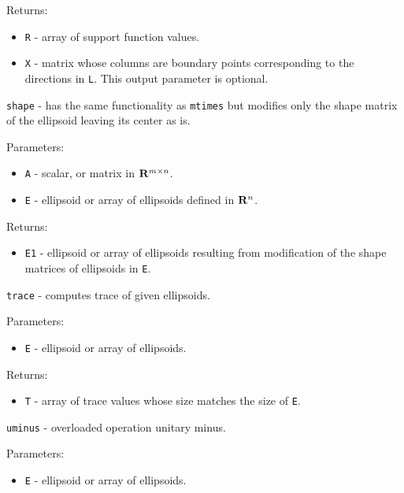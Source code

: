 \documentclass{report}
\begin{document}
Returns:
\begin{itemize}
\item {\tt R} - array of support function values.
\item {\tt X} - matrix whose columns are boundary points corresponding
to the directions in {\tt L}. This output parameter is optional.
\end{itemize}

\newpage

{\Large {\tt shape}} - has the same functionality as {\tt mtimes} but
modifies only the shape matrix of the ellipsoid leaving its center as is.

Parameters:
\begin{itemize}
\item {\tt A} - scalar, or matrix in ${\bf R}^{m\times n}$.
\item {\tt E} - ellipsoid or array of ellipsoids defined in ${\bf R}^n$.
\end{itemize}

Returns:
\begin{itemize}
\item {\tt E1} - ellipsoid or array of ellipsoids resulting from modification
of the shape matrices of ellipsoids in {\tt E}.
\end{itemize}



\newpage

{\Large {\tt trace}} - computes trace of given ellipsoids.

Parameters:
\begin{itemize}
\item {\tt E} - ellipsoid or array of ellipsoids.
\end{itemize}

Returns:
\begin{itemize}
\item {\tt T} - array of trace values whose size matches the size of {\tt E}.
\end{itemize}



\newpage


{\Large {\tt uminus}} - overloaded operation unitary minus.

Parameters:
\begin{itemize}
\item {\tt E} - ellipsoid or array of ellipsoids.
\end{itemize}
\end{document}
